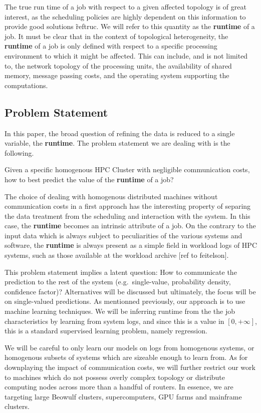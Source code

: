 \documentclass{article}
\begin{document}
The true run time of a job with respect to a given affected topology is of great interest, as the scheduling policies are highly dependent on this information to provide good solutions \~ref{truc}. We will refer to this quantity as the \textbf{runtime} of a job.
It must be clear that in the context of topological heterogeneity, the \textbf{runtime} of a job is only defined with respect to a specific processing environment to which it might be affected.
This can include, and is not limited to, the network topology of the processing units, the availability of shared memory, message passing costs, and the operating system supporting the computations.

\subsection{Problem Statement}
In this paper, the broad question of refining the data is reduced to a single variable, the \textbf{runtime}. The problem statement we are dealing with is the following.

Given a specific homogenous HPC Cluster with negligible communication costs, how to best predict the value of the \textbf{runtime} of a job?

The choice of dealing with homogenous distributed machines without communication costs in a first approach has the interesting property of separing the data treatment from the scheduling and interaction with the system.
In this case, the \textbf{runtime} becomes an intrinsic attribute of a job.
On the contrary to the input data which is always subject to peculiarities of the various systems and software, the \textbf{runtime} is always present as a simple field in workload logs of HPC systems, such as those available at the workload archive [ref to feitelson].

This problem statement implies a latent question: How to communicate the prediction to the rest of the system (e.g.\ single-value, probability density, confidence factor)? Alternatives will be discussed but ultimately, the focus will be on single-valued predictions.
As mentionned previously, our approach is to use machine learning techniques. We will be inferring runtime from the the job characteristics by learning from system logs, and since this is a value in $[0,+\infty ]$, this is a standard supervised learning problem, namely regression.

We will be careful to only learn our models on logs from homogenous systems, or homogenous subsets of systems which are sizeable enough to learn from.
As for downplaying the impact of communication costs, we will further restrict our work to machines which do not possess overly complex topology or distribute computing nodes across more than a handful of routers.
In essence, we are targeting large Beowulf clusters, supercomputers, GPU farms and mainframe clusters.
\end{document}
